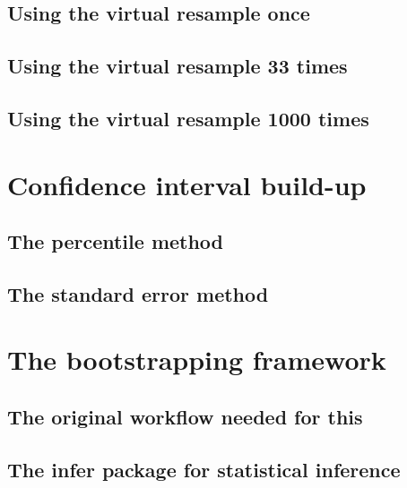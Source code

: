 \documentclass[
  12pt, krantz2,
]{krantz}
\begin{document}
\hypertarget{using-the-virtual-resample-once}{%
\subsection{Using the virtual resample once}\label{using-the-virtual-resample-once}}

\hypertarget{using-the-virtual-resample-33-times}{%
\subsection{Using the virtual resample 33 times}\label{using-the-virtual-resample-33-times}}

\hypertarget{using-the-virtual-resample-1000-times}{%
\subsection{Using the virtual resample 1000 times}\label{using-the-virtual-resample-1000-times}}

\hypertarget{ci-build-up}{%
\section{Confidence interval build-up}\label{ci-build-up}}

\hypertarget{percentile-method}{%
\subsection{The percentile method}\label{percentile-method}}

\hypertarget{the-standard-error-method}{%
\subsection{The standard error method}\label{the-standard-error-method}}

\hypertarget{bootstrap-process}{%
\section{The bootstrapping framework}\label{bootstrap-process}}

\hypertarget{the-original-workflow-needed-for-this}{%
\subsection{The original workflow needed for this}\label{the-original-workflow-needed-for-this}}

\hypertarget{the-infer-package-for-statistical-inference}{%
\subsection{The infer package for statistical inference}\label{the-infer-package-for-statistical-inference}}
\end{document}
